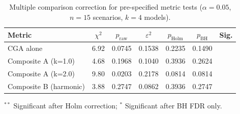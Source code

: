 \begin{table}[ht]
\centering
\caption{Multiple comparison correction for pre-specified metric tests ($\alpha=0.05$, $n=15$ scenarios, $k=4$ models).}
\label{tab:multiple_comparison}
\begin{tabular}{lcccccc}
\toprule
Metric & $\chi^2$ & $p_{\text{raw}}$ & $\varepsilon^2$ & $p_{\text{Holm}}$ & $p_{\text{BH}}$ & Sig. \\
\midrule
  CGA alone & 6.92 & 0.0745 & 0.1538 & 0.2235 & 0.1490 &  \\
  Composite A (k=1.0) & 4.68 & 0.1968 & 0.1040 & 0.3936 & 0.2624 &  \\
  Composite A (k=2.0) & 9.80 & 0.0203 & 0.2178 & 0.0814 & 0.0814 &  \\
  Composite B (harmonic) & 3.88 & 0.2747 & 0.0862 & 0.3936 & 0.2747 &  \\
\bottomrule
\end{tabular}
\begin{tablenotes}\small
\item $^{**}$ Significant after Holm correction; $^{*}$ Significant after BH FDR only.
\end{tablenotes}
\end{table}
